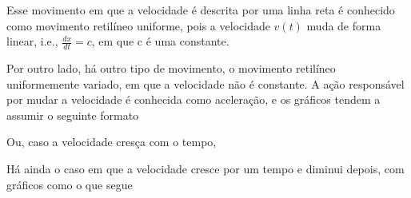 \documentclass{article}
\begin{document}
  Esse movimento em que a velocidade \'e descrita por uma linha reta \'e conhecido como movimento retil\'ineo uniforme, pois 
a velocidade $v(t)$ muda de forma linear, i.e., $\frac{dx}{dt} = c$, em que c \'e uma constante.

  Por outro lado, h\'a outro tipo de movimento, o movimento retil\'ineo uniformemente variado, em que a velocidade n\~ao \'e constante.
A a\c c\~ao respons\'avel por mudar a velocidade \'e conhecida como acelera\c c\~ao, e os gr\'aficos tendem a assumir o seguinte formato


Ou, caso a velocidade cres\c ca com o tempo,


H\'a ainda o caso em que a velocidade cresce por um tempo e diminui depois, com gr\'aficos como o que segue
 
\end{document}

